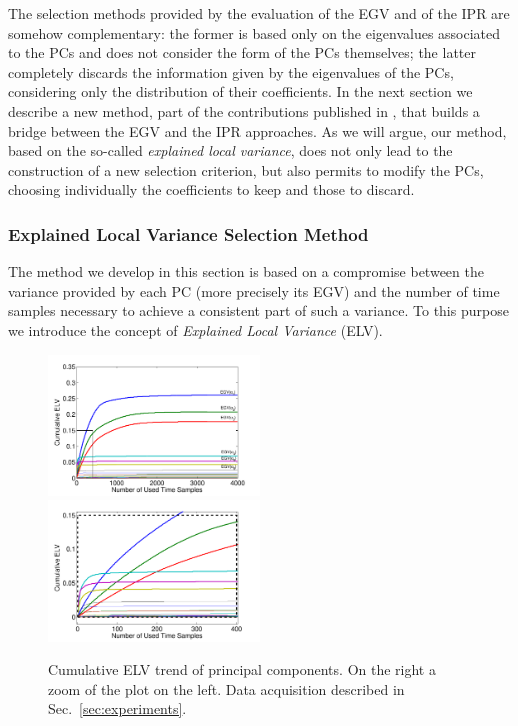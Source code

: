 The selection methods provided by the evaluation of the EGV and of the IPR are somehow complementary: the former is based only on the eigenvalues associated to the PCs and does not consider the form of the PCs themselves; the latter completely discards the information given by the eigenvalues of the PCs, considering only the distribution of their coefficients. In the next section we describe a new method, part of the contributions published in \cite{cagli2015enhancing}, that builds a bridge between the EGV and the IPR approaches. As we will argue, our method, based on the so-called {\em explained local variance}, does not only lead to the construction of a new selection criterion, but also permits  to modify the PCs, choosing individually the coefficients to keep and those to discard. 

\subsubsection{Explained Local Variance Selection Method}\label{sec:ELVmethod}
The method we develop in this section is based on a compromise between the variance provided by each PC (more precisely its EGV) and the number of time samples necessary to achieve a consistent part of such a variance. To this purpose we  introduce the concept of {\em Explained Local Variance} (ELV).
\begin{figure}
\includegraphics[width=0.5\textwidth]{../Figures/CARDIS2015/cumulativeELVallRectangle.pdf} 
\includegraphics[width=0.5\textwidth]{../Figures/CARDIS2015/cumulativeELVzoomedRectangle.pdf} 
\caption[Cumulative ELV trend of principal components.]{Cumulative ELV trend of principal components. On the right a zoom of the plot on the left. Data acquisition described in Sec.~\ref{sec:experiments}.}\label{fig:ELVcumulative}
\end{figure}
